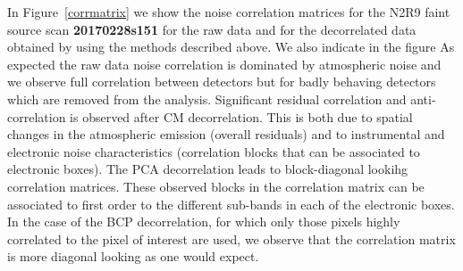 In Figure~\ref{corrmatrix} we show the noise correlation matrices for the N2R9 faint source scan {\bf 20170228s151} for the raw
data and for the decorrelated data obtained by using the methods described above. We also indicate in the figure
As expected the raw data noise correlation is dominated by atmospheric noise and we observe full correlation between detectors but for badly behaving detectors which are removed from the analysis. Significant residual correlation and anti-correlation is observed after CM decorrelation.
This is both due to spatial changes in the atmospheric emission (overall residuals) and to instrumental and electronic noise characteristics (correlation blocks that can be associated to electronic boxes).  
The PCA decorrelation leads to block-diagonal lookihg correlation matrices. These observed blocks in the correlation matrix can be associated to first order to the different sub-bands in each of the electronic boxes. In the case of the BCP decorrelation,
for which only those pixels highly correlated to the pixel of interest are used, we observe that the correlation matrix is more diagonal looking as one would expect.


